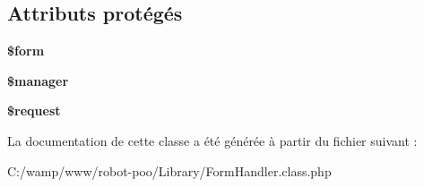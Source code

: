 \subsection*{Attributs protégés}
\begin{DoxyCompactItemize}
\item 
\hypertarget{class_library_1_1_form_handler_a1a4fda4c28a9ee5f91102c023b9501f4}{{\bfseries \$form}}\label{class_library_1_1_form_handler_a1a4fda4c28a9ee5f91102c023b9501f4}

\item 
\hypertarget{class_library_1_1_form_handler_a4621b1cd69b1417c9fb966c825299de1}{{\bfseries \$manager}}\label{class_library_1_1_form_handler_a4621b1cd69b1417c9fb966c825299de1}

\item 
\hypertarget{class_library_1_1_form_handler_abb35c8495a232b510389fa6d7b15d38a}{{\bfseries \$request}}\label{class_library_1_1_form_handler_abb35c8495a232b510389fa6d7b15d38a}

\end{DoxyCompactItemize}


La documentation de cette classe a été générée à partir du fichier suivant \+:\begin{DoxyCompactItemize}
\item 
C\+:/wamp/www/robot-\/poo/\+Library/Form\+Handler.\+class.\+php\end{DoxyCompactItemize}

